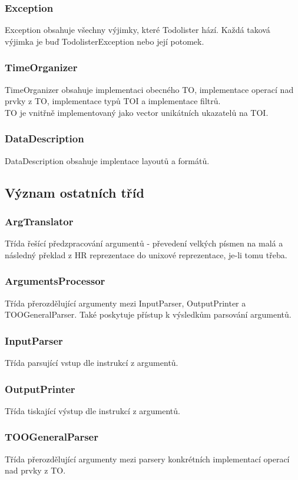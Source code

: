 \documentclass[11pt]{article}
\begin{document}
\subsubsection{Exception}
Exception obsahuje všechny výjimky, které Todolister hází. Každá taková výjimka je  buď TodolisterException nebo její potomek.
\subsubsection{TimeOrganizer}
TimeOrganizer obsahuje implementaci obecného TO, implementace operací nad prvky z TO, implementace typů TOI a implementace filtrů.\\
TO je vnitřně implementovaný jako vector unikátních ukazatelů na TOI.
\subsubsection{DataDescription}
DataDescription obsahuje implentace layoutů a formátů.

\subsection{Význam ostatních tříd}
\subsubsection{ArgTranslator}
Třída řešící předzpracování argumentů - převedení velkých písmen na malá a následný překlad z HR reprezentace do unixové reprezentace, je-li tomu třeba.
\subsubsection{ArgumentsProcessor}
Třída přerozdělující argumenty mezi InputParser, OutputPrinter a TOOGeneralParser. Také poskytuje přístup k výsledkům parsování argumentů.
\subsubsection{InputParser}
Třída parsující vstup dle instrukcí z argumentů.
\subsubsection{OutputPrinter}
Třída tiskající výstup dle instrukcí z argumentů.
\subsubsection{TOOGeneralParser}
Třída přerozdělující argumenty mezi parsery konkrétních implementací operací nad prvky z TO.
\end{document}
